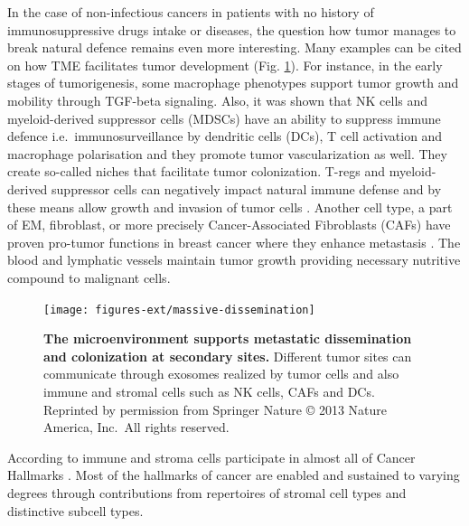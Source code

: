 \documentclass[12pt,]{book}
\theoremstyle{definition}
\theoremstyle{definition}
\theoremstyle{definition}
\theoremstyle{remark}
\begin{document}
In the case of non-infectious cancers in patients with no history of
immunosuppressive drugs intake or diseases, the question how tumor
manages to break natural defence remains even more interesting. Many
examples can be cited on how TME facilitates tumor development (Fig.
\ref{fig:met-dis}). For instance, in the early stages of tumorigenesis,
some macrophage phenotypes support tumor growth and mobility through
TGF-beta signaling. Also, it was shown that NK cells and myeloid-derived
suppressor cells (MDSCs) have an ability to suppress immune defence
i.e.~immunosurveillance by dendritic cells (DCs), T cell activation and
macrophage polarisation and they promote tumor vascularization as well.
\citep{Talmadge2013, Gabrilovich2012} They create so-called niches that
facilitate tumor colonization. T-regs and myeloid-derived suppressor
cells can negatively impact natural immune defense and by these means
allow growth and invasion of tumor cells \citep{Taube2017a}. Another
cell type, a part of EM, fibroblast, or more precisely Cancer-Associated
Fibroblasts (CAFs) have proven pro-tumor functions in breast cancer
where they enhance metastasis \citep{Dumont2013}. The blood and
lymphatic vessels maintain tumor growth providing necessary nutritive
compound to malignant cells.

\begin{figure}

{\centering \texttt{[image: figures-ext/massive-dissemination]} 

}

\caption[The microenvironment supports metastatic dissemination and colonization at secondary sites.]{\textbf{The microenvironment supports metastatic
dissemination and colonization at secondary sites.} Different tumor
sites can communicate through exosomes realized by tumor cells and also
immune and stromal cells such as NK cells, CAFs and DCs. Reprinted by
permission from Springer Nature \citep{Quail2013} © 2013 Nature America,
Inc.~All rights reserved.}\label{fig:met-dis}
\end{figure}








According to \citep{Hanahan2012} immune and stroma cells participate in
almost all of Cancer Hallmarks \citep{Hanahan2000, Hanahan2012}. Most of
the hallmarks of cancer are enabled and sustained to varying degrees
through contributions from repertoires of stromal cell types and
distinctive subcell types.
\end{document}
